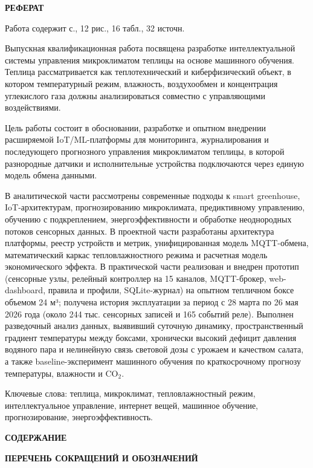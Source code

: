 \documentclass[a4paper,14pt]{extarticle}
\newcommand{\VkrStructuralSection}[1]{%
  \FloatBarrier
  \clearpage
  \phantomsection
  \addcontentsline{toc}{section}{#1}%
  \begin{center}\bfseries #1\end{center}%
  \par\nopagebreak\vspace{12pt}%
}
\newcommand{\VkrStructuralSectionNoToc}[1]{%
  \begin{center}\bfseries #1\end{center}%
  \par\nopagebreak\vspace{12pt}%
}
\begin{document}
\hypertarget{ux440ux435ux444ux435ux440ux430ux442}{%
\VkrStructuralSectionNoToc{РЕФЕРАТ}\label{ux440ux435ux444ux435ux440ux430ux442}}

Работа содержит \pageref{LastPage} с., 12 рис., 16 табл., 32 источн.

Выпускная квалификационная работа посвящена разработке интеллектуальной
системы управления микроклиматом теплицы на основе машинного обучения.
Теплица рассматривается как теплотехнический и киберфизический объект, в
котором температурный режим, влажность, воздухообмен и концентрация
углекислого газа должны анализироваться совместно с управляющими
воздействиями.

Цель работы состоит в обосновании, разработке и опытном внедрении
расширяемой IoT/ML-платформы для мониторинга, журналирования и
последующего прогнозного управления микроклиматом теплицы, в которой
разнородные датчики и исполнительные устройства подключаются через
единую модель обмена данными.

В аналитической части рассмотрены современные подходы к smart
greenhouse, IoT-архитектурам, прогнозированию микроклимата,
предиктивному управлению, обучению с подкреплением, энергоэффективности
и обработке неоднородных потоков сенсорных данных. В проектной части
разработаны архитектура платформы, реестр устройств и метрик,
унифицированная модель MQTT-обмена, математический каркас
тепловлажностного режима и расчетная модель экономического эффекта. В
практической части реализован и внедрен прототип (сенсорные узлы,
релейный контроллер на 15 каналов, MQTT-брокер, web-dashboard, правила и
профили, SQLite-журнал) на опытном тепличном боксе объемом 24 м³;
получена история эксплуатации за период с 28 марта по 26 мая 2026 года
(около 244 тыс. сенсорных записей и 165 событий реле). Выполнен
разведочный анализ данных, выявивший суточную динамику, пространственный
градиент температуры между боксами, хронически высокий дефицит давления
водяного пара и нелинейную связь световой дозы с урожаем и качеством
салата, а также baseline-эксперимент машинного обучения по
краткосрочному прогнозу температуры, влажности и CO\(_2\).

Ключевые слова: теплица, микроклимат, тепловлажностный режим,
интеллектуальное управление, интернет вещей, машинное обучение,
прогнозирование, энергоэффективность.

\clearpage

\VkrStructuralSectionNoToc{СОДЕРЖАНИЕ}
\makeatletter{}\makeatother
\clearpage

\hypertarget{ux441ux43fux438ux441ux43eux43a-ux441ux43eux43aux440ux430ux449ux435ux43dux438ux439-ux438-ux43eux431ux43eux437ux43dux430ux447ux435ux43dux438ux439}{%
\VkrStructuralSection{ПЕРЕЧЕНЬ СОКРАЩЕНИЙ И ОБОЗНАЧЕНИЙ}\label{ux441ux43fux438ux441ux43eux43a-ux441ux43eux43aux440ux430ux449ux435ux43dux438ux439-ux438-ux43eux431ux43eux437ux43dux430ux447ux435ux43dux438ux439}}
\end{document}

